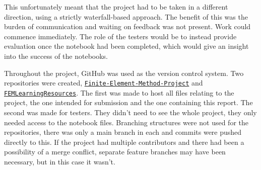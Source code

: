 This unfortunately meant that the project had to be taken in a different direction, using a strictly waterfall-based approach. The benefit of this was the burden of communication and waiting on feedback was not present. Work could commence immediately. The role of the testers would be to instead provide evaluation once the notebook had been completed, which would give an insight into the success of the notebooks.

Throughout the project, GitHub was used as the version control system. Two repositories were created, \href{https://github.com/Crypto84/Finite-Element-Method-Project}{\texttt{Finite-Element-Method-Project}} and \href{https://github.com/Crypto84/FEMLearningResources}{\texttt{FEMLearningResources}}. The first was made to host all files relating to the project, the one intended for submission and the one containing this report. The second was made for testers. They didn't need to see the whole project, they only needed access to the notebook files. Branching structures were not used for the repositories, there was only a main branch in each and commits were pushed directly to this. If the project had multiple contributors and there had been a possibility of a merge conflict, separate feature branches may have been necessary, but in this case it wasn't.